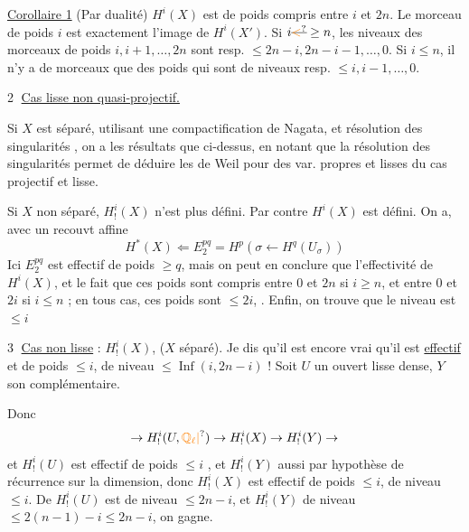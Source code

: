 \uline{Corollaire 1} \quad (Par dualité) $H^i(X)$ est de poids compris entre $i$ et $2n$. Le morceau  de poids $i$ est exactement l'image de $H^i(X')$. Si $i\deleted{\unsure{<}}\ge n$, les niveaux des morceaux de poids $i,i+1,\ldots,2n$ sont resp. $\le 2n-i,2n-i-1,\ldots,0$. Si $i\le n$, il n'y a de morceaux  que des poids   qui sont de niveaux resp. $\le i,i-1,\ldots,0$.

\textcircled{2} \uline{Cas  lisse non quasi-projectif.}

Si $X$ est séparé, utilisant une compactification de Nagata, et résolution des singularités , on a les  résultats que ci-dessus, en notant que la résolution des singularités permet de déduire les  de Weil pour des var. propres et lisses du cas projectif et lisse.

Si $X$ non séparé, $H^i_!(X)$ n'est plus défini. Par contre $H^i(X)$ est défini. On a, avec un recouvt affine
\[
 H^*(X)\Longleftarrow E^{pq}_2=H^p(\sigma\longleftarrow H^q(U_\sigma))
\]
Ici $E^{pq}_2$ est effectif de poids $\ge q$, mais  on peut en conclure que l'effectivité de $H^i(X)$, et le fait que ces poids sont compris entre $0$ et $2n$ si $i\ge n$, et entre $0$ et $2i$ si $i\le n$ ; en tous cas, ces poids sont $\le 2i$, . Enfin, on trouve que le niveau est $\le i$ 


\textcircled{3} \uline{Cas non lisse} : $H^i_!(X)$, ($X$ séparé). Je dis qu'il est encore vrai qu'il est \uline{effectif} et de poids $\le i$, de niveau $\le\operatorname{Inf}(i,2n-i)$ ! Soit $U$ un ouvert lisse dense, $Y$ son complémentaire.

Donc
\[
 \to H^i_!(U,\unsure{\mathbb Q_\ell|{}})\to H^i_!(X)\to H^i_!(Y)\to
\]
et $H^i_!(U)$ est effectif de poids $\le i$ , et $H^i_!(Y)$ aussi par hypothèse de récurrence sur la dimension, donc $H^i_!(X)$ est effectif de poids $\le i$, de niveau $\le i$. De  $H^i_!(U)$ est de niveau $\le 2n-i$, et $H^i_!(Y)$ de niveau $\le 2(n-1)-i\le 2n-i$, on gagne.


